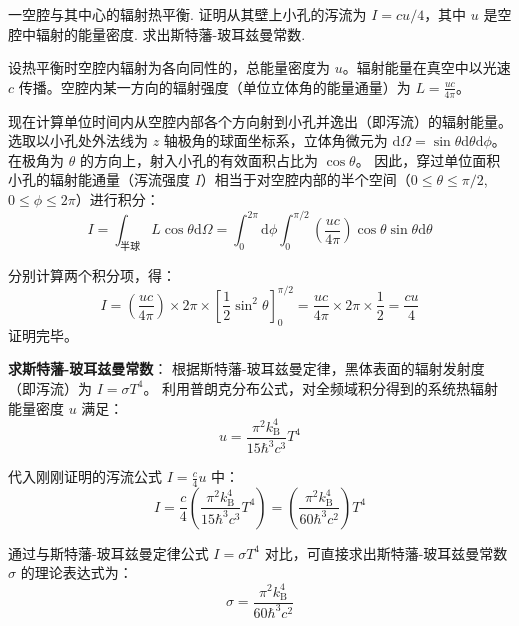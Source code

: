 \begin{exercise}\label{ex:22.3}
一空腔与其中心的辐射热平衡. 证明从其壁上小孔的泻流为 $I = cu/4$，其中 $u$ 是空腔中辐射的能量密度. 求出斯特藩-玻耳兹曼常数.
\end{exercise}
\begin{solution}
设热平衡时空腔内辐射为各向同性的，总能量密度为 $u$。辐射能量在真空中以光速 $c$ 传播。空腔内某一方向的辐射强度（单位立体角的能量通量）为 $L = \frac{u c}{4\pi}$。

现在计算单位时间内从空腔内部各个方向射到小孔并逸出（即泻流）的辐射能量。选取以小孔处外法线为 $z$ 轴极角的球面坐标系，立体角微元为 $\mathrm{d}\Omega = \sin\theta \mathrm{d}\theta \mathrm{d}\phi$。在极角为 $\theta$ 的方向上，射入小孔的有效面积占比为 $\cos\theta$。
因此，穿过单位面积小孔的辐射能通量（泻流强度 $I$）相当于对空腔内部的半个空间（$0 \le \theta \le \pi/2$, $0 \le \phi \le 2\pi$）进行积分：
$$ I = \int_{\text{半球}} L \cos\theta \mathrm{d}\Omega = \int_0^{2\pi} \mathrm{d}\phi \int_0^{\pi/2} \left( \frac{u c}{4\pi} \right) \cos\theta \sin\theta \mathrm{d}\theta $$

分别计算两个积分项，得：
$$ I = \left( \frac{u c}{4\pi} \right) \times 2\pi \times \left[ \frac{1}{2}\sin^2\theta \right]_0^{\pi/2} = \frac{u c}{4\pi} \times 2\pi \times \frac{1}{2} = \frac{c u}{4} $$
证明完毕。

\textbf{求斯特藩-玻耳兹曼常数}：
根据斯特藩-玻耳兹曼定律，黑体表面的辐射发射度（即泻流）为 $I = \sigma T^4$。
利用普朗克分布公式，对全频域积分得到的系统热辐射能量密度 $u$ 满足：
$$ u = \frac{\pi^2 k_{\mathrm{B}}^4}{15 \hbar^3 c^3} T^4 $$

代入刚刚证明的泻流公式 $I = \frac{c}{4} u$ 中：
$$ I = \frac{c}{4} \left( \frac{\pi^2 k_{\mathrm{B}}^4}{15 \hbar^3 c^3} T^4 \right) = \left( \frac{\pi^2 k_{\mathrm{B}}^4}{60 \hbar^3 c^2} \right) T^4 $$

通过与斯特藩-玻耳兹曼定律公式 $I = \sigma T^4$ 对比，可直接求出斯特藩-玻耳兹曼常数 $\sigma$ 的理论表达式为：
$$ \sigma = \frac{\pi^2 k_{\mathrm{B}}^4}{60 \hbar^3 c^2} $$
\end{solution}

